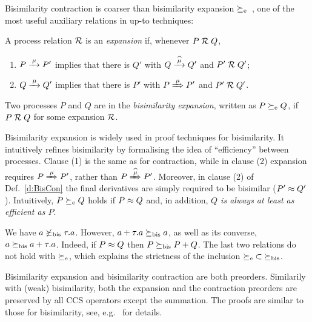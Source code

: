 Bisimilarity contraction is coarser than bisimilarity expansion
$\mathrel{\succeq_{\rm{e}}}$~\cite{arun1992efficiency,sangiorgi2015equations}, one of the
most useful auxiliary relations in up-to techniques:
\begin{definition}[expansion]
\label{d:expa}
A process relation ${{\cal R}}$
  is an \emph{expansion} if, whenever $P\mathrel{\cal R} Q$,
 \begin{enumerate}
 \item   $P \arr\mu P'$ implies that there is $Q'$ with $Q \arcap \mu  Q'$
  and $P' \mathrel{\cal R} Q'$;
 \item $Q \arr\mu Q'$ implies that there is $P'$ with $P \Arr \mu P'$ and $P' \mathrel{\cal R} Q'$.
 \end{enumerate}
Two processes $P$ and $Q$ are in the \emph{bisimilarity
  expansion}, written as $P \mathrel{\succeq_{\rm{e}}} Q$, if $P \mathrel{\cal R} Q$ for some expansion ${\cal R}$.
 \end{definition}
Bisimilarity expansion is widely used in proof techniques for bisimilarity.
It intuitively refines bisimilarity by 
formalising the idea of ``efficiency'' between processes.
Clause (1) is the same as for contraction, while in clause (2) expansion requires
$P \Arr \mu P'$, rather than $P \Arcap \mu P'$.
Moreover, in clause (2) of Def.~\ref{d:BisCon} the final derivatives
are simply required to be bisimilar ($P' \approx Q'$).
Intuitively, $P \mathrel{\succeq_{\rm{e}}} Q$ holds if $P\approx Q$ and, in addition, \emph{$Q$
  is always at least as efficient as $P$}.

\begin{example}
\label{exa:contr}
We have %
 $ a \not  \mathrel{\succeq_{\rm{bis}}} \tau. a$. However,
$a+ \tau . a \mathrel{\succeq_{\rm{bis}}} a$, as well as its converse, 
$  a \mathrel{\succeq_{\rm{bis}}} a +
\tau . a $. Indeed, if $P \approx Q$ then 
$  P  \mathrel{\succeq_{\rm{bis}}} P +Q$. The last two relations do not hold with 
$\mathrel{\succeq_{\rm{e}}}$, which explains the strictness of the inclusion
 ${\mathrel{\succeq_{\rm{e}}}} \subset {\mathrel{\succeq_{\rm{bis}}}}$. 
\end{example} 

Bisimilarity expansion and bisimilarity contraction are both preorders.
Similarily with (weak) bisimilarity, both the expansion and the
contraction preorders are preserved by all CCS operators except the
summation. The proofs are similar to those for bisimilarity,
see, e.g.~\cite{sangiorgi2017equations} for details.

